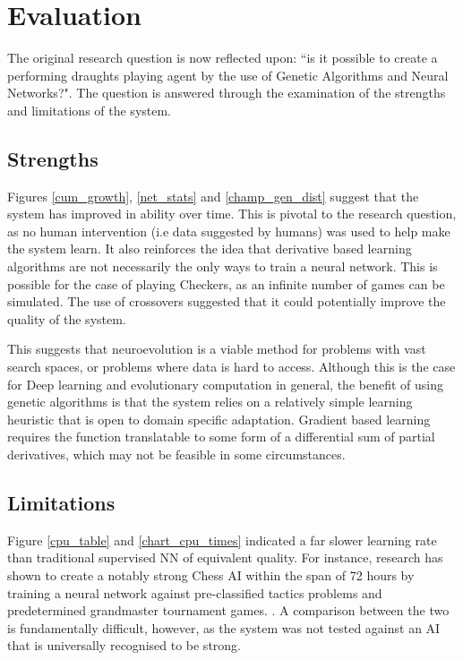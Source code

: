 \documentclass[12pt,a4paper]{article}
\begin{document}
\section{Evaluation}

    The original research question is now reflected upon: ``is it possible to create a performing draughts playing agent by the use of Genetic Algorithms and Neural Networks?".  The question is answered through the examination of the strengths and limitations of the system.

    \subsection{Strengths}

    Figures \ref{cum_growth}, \ref{net_stats} and \ref{champ_gen_dist} suggest that the system has improved in ability over time. This is pivotal to the research question, as no human intervention (i.e data suggested by humans) was used to help make the system learn. It also reinforces the idea that derivative based learning algorithms are not necessarily the only ways to train a neural network. This is possible for the case of playing Checkers, as an infinite number of games can be simulated. The use of crossovers suggested that it could potentially improve the quality of the system.
    
    This suggests that neuroevolution is a viable method for problems with vast search spaces, or problems where data is hard to access. Although this is the case for Deep learning and evolutionary computation in general, the benefit of using genetic algorithms is that the system relies on a relatively simple learning heuristic that is open to domain specific adaptation. Gradient based learning requires the function  translatable to some form of a differential sum of partial derivatives, which may not be feasible in some circumstances.

    \subsection{Limitations}
    Figure \ref{cpu_table} and \ref{chart_cpu_times} indicated a far slower learning rate than traditional supervised NN of equivalent quality. For instance, research has shown to create a notably strong Chess AI within the span of 72 hours by training a neural network against pre-classified tactics problems and predetermined grandmaster tournament games. \cite{lai_giraffe:_2015}. A comparison between the two is fundamentally difficult, however, as the system was not tested against an AI that is universally recognised to be strong.
\end{document}
